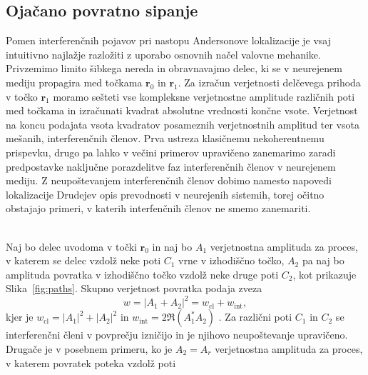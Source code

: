  \subsection{Ojačano povratno sipanje}
 Pomen interferenčnih pojavov pri nastopu Andersonove lokalizacije je vsaj intuitivno najlažje razložiti z uporabo osnovnih načel valovne mehanike. Privzemimo limito šibkega nereda in obravnavajmo delec, ki se v neurejenem mediju propagira med točkama $\textbf{r}_0$ in $\textbf{r}_1$. Za izračun verjetnosti delčevega prihoda v točko $\textbf{r}_1$ moramo sešteti vse kompleksne verjetnostne amplitude različnih poti med točkama in izračunati kvadrat absolutne vrednosti končne vsote. Verjetnost na koncu podajata vsota kvadratov posameznih verjetnostnih amplitud ter vsota mešanih, interferenčnih členov. Prva ustreza klasičnemu nekoherentnemu prispevku, drugo pa lahko v večini primerov upravičeno zanemarimo zaradi predpostavke naključne porazdelitve faz interferenčnih členov v neurejenem mediju. Z neupoštevanjem interferenčnih členov dobimo namesto napovedi lokalizacije Drudejev opis prevodnosti v neurejenih sistemih, torej očitno obstajajo primeri, v katerih interfenčnih členov ne smemo zanemariti. \\\\
 \begin{minipage}[t]{0.55\textwidth}
\noindent  
Naj bo delec uvodoma v točki $\mathbf{r}_0$ in naj bo $A_1$ verjetnostna amplituda za proces, v katerem se delec vzdolž neke poti $C_1$ vrne v izhodiščno točko, $A_2$ pa naj bo amplituda povratka v izhodiščno točko vzdolž neke druge poti $C_2$, kot prikazuje Slika~\ref{fig:paths}.
Skupno verjetnost povratka podaja zveza 
\begin{equation}
w=|A_1 + A_2|^2=w_\mathrm{cl} + w_\mathrm{int},
\end{equation}
kjer je $w_\mathrm{cl}=|A_1|^2 + |A_2|^2$ in $w_\mathrm{int}=2\Re\left(A_1^*A_2\right)$ \cite{wolfle2010self}. Za različni poti $C_1$ in $C_2$ se interferenčni členi v povprečju izničijo in je njihovo neupoštevanje upravičeno. Drugače je v posebnem primeru, ko je  $A_2=A_r$ verjetnostna amplituda za proces, v katerem povratek poteka vzdolž poti 
\end{minipage}\hfill
